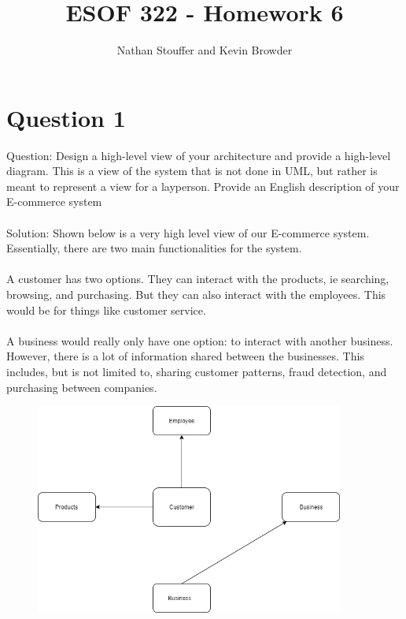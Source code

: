 \documentclass{article}
\begin{document}
	
\title{ESOF 322 - Homework 6}
\author{Nathan Stouffer and Kevin Browder}

\maketitle
\newpage

\section*{Question 1}
Question: Design a high-level view of your architecture and provide a high-level diagram. This is a view of the system that is not done in UML, but rather is meant to represent a view for a layperson.
Provide an English description of your E-commerce system \\\\
Solution: Shown below is a very high level view of our E-commerce system. Essentially, there are two main functionalities for the system. \\\\
A customer has two options. They can interact with the products, ie searching, browsing, and purchasing. But they can also interact with the employees. This would be for things like customer service. \\\\
A business would really only have one option: to interact with another business. However, there is a lot of information shared between the businesses. This includes, but is not limited to, sharing customer patterns, fraud detection, and purchasing between companies. \\
\begin{figure}[h]
	\includegraphics[width=4in]{english.jpg}
\end{figure}

\newpage
\end{document}
